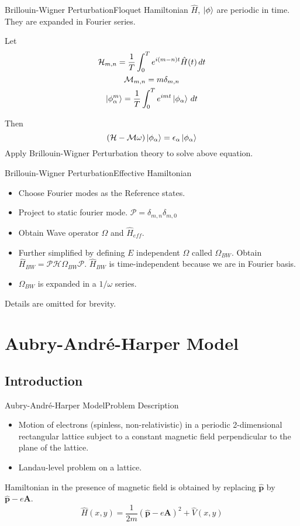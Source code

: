 \documentclass{beamer}
\begin{document}
\begin{frame}{Brillouin-Wigner Perturbation}{Floquet Hamiltonian}
 $\hat{H}$, $\ket{\phi}$ are periodic in time. They are expanded in Fourier series.
 
 Let
 \begin{gather}
  \mathcal{H}_{m,n} = \frac{1}{T}\int_{0}^{T}e^{i(m-n)t}\hat{H}(t)\,dt \\
  \mathcal{M}_{m,n} = m\delta_{m,n}\\
  \ket{\phi_{\alpha}^{m}} = \frac{1}{T}\int_{0}^{T}e^{imt}\ket{\phi_{\alpha}}\,dt
 \end{gather}
 
 Then
 \begin{equation}
  (\mathcal{H} - \mathcal{M}\omega)\ket{\phi_{\alpha}} = \epsilon_{\alpha}\ket{\phi_{\alpha}}
 \end{equation}
 Apply Brillouin-Wigner Perturbation theory to solve above equation.
\end{frame}
\begin{frame}{Brillouin-Wigner Perturbation}{Effective Hamiltonian}
\begin{itemize}
 \item Choose Fourier modes as the Reference states.
 \item Project to static fourier mode. $\mathcal{P} = \delta_{m,n}\delta_{m,0}$
 \item Obtain Wave operator $\Omega$ and $\hat{H}_{eff}$.
 \item Further simplified by defining $E$ independent $\Omega$ called $\Omega_{BW}$.
Obtain $\hat{H}_{BW} = \mathcal{P}\mathcal{H}\Omega_{BW}\mathcal{P}$.
$\hat{H}_{BW}$ is time-independent because we are in Fourier basis.
\item $\Omega_{BW}$ is expanded in a $1/\omega$ series.
\end{itemize}

\tiny \alert{Details are omitted for brevity.} \normalsize
\end{frame}

\section{Aubry-Andr\'{e}-Harper Model}
\subsection{Introduction}
\begin{frame}{Aubry-Andr\'{e}-Harper Model}{Problem Description}
 \begin{itemize}
  \item Motion of electrons (spinless, non-relativistic) in a periodic 2-dimensional rectangular lattice subject to a constant magnetic field perpendicular to the plane of the lattice.
  \item Landau-level problem on a lattice.
 \end{itemize}
Hamiltonian in the presence of magnetic field is obtained by replacing $\hat{\mathbf{p}}$ by $\hat{\mathbf{p}} - e\mathbf{A}$.
\begin{equation}
 \hat{H}(x, y) = \frac{1}{2m}(\hat{\mathbf{p}} - e\mathbf{A})^2 + \hat{V}(x,y)
\end{equation}
\end{frame}
\end{document}
